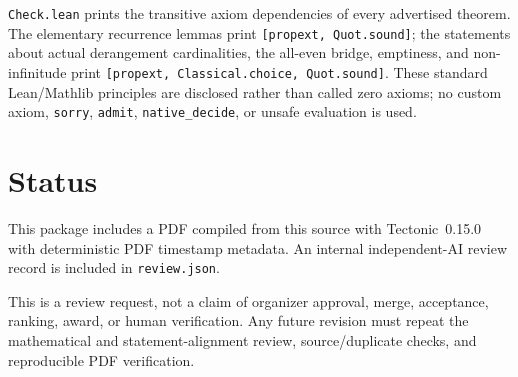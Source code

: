 \documentclass[11pt]{article}
\begin{document}
\texttt{Check.lean} prints the transitive axiom dependencies of every
advertised theorem.  The elementary recurrence lemmas print
{\footnotesize\texttt{[propext, Quot.sound]}}; the statements about actual derangement
cardinalities, the all-even bridge, emptiness, and non-infinitude print
{\footnotesize\texttt{[propext, Classical.choice, Quot.sound]}}.  These standard Lean/Mathlib
principles are disclosed rather than called zero axioms; no custom axiom,
\texttt{sorry}, \texttt{admit}, \texttt{native\_decide}, or unsafe evaluation
is used.

\section*{Status}
This package includes a PDF compiled from this source with Tectonic~0.15.0
with deterministic PDF timestamp metadata. An internal independent-AI review
record is included in \texttt{review.json}.

This is a review request, not a claim of organizer approval, merge, acceptance,
ranking, award, or human verification. Any future revision must repeat the
mathematical and statement-alignment review, source/duplicate checks, and
reproducible PDF verification.
\end{document}
